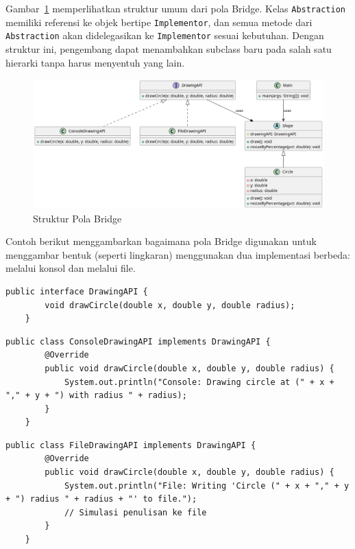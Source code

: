 Gambar~\ref{fig:bridge} memperlihatkan struktur umum dari pola Bridge. Kelas \texttt{Abstraction} memiliki referensi ke objek bertipe \texttt{Implementor}, dan semua metode dari \texttt{Abstraction} akan didelegasikan ke \texttt{Implementor} sesuai kebutuhan. Dengan struktur ini, pengembang dapat menambahkan subclass baru pada salah satu hierarki tanpa harus menyentuh yang lain.

\begin{figure}[h]
	\centering
	\includegraphics[width=\textwidth]{../figures/out/bridge.png}
	\caption{Struktur Pola Bridge}
	\label{fig:bridge}
\end{figure}

Contoh berikut menggambarkan bagaimana pola Bridge digunakan untuk menggambar bentuk (seperti lingkaran) menggunakan dua implementasi berbeda: melalui konsol dan melalui file.

\begin{lstlisting}[style=JavaStyle, caption={Implementor: DrawingAPI}, label={lst:bridge-api}]
	public interface DrawingAPI {
		void drawCircle(double x, double y, double radius);
	}
\end{lstlisting}

\begin{lstlisting}[style=JavaStyle, caption={Implementasi Konkret: ConsoleDrawingAPI}, label={lst:bridge-api-console}]
	public class ConsoleDrawingAPI implements DrawingAPI {
		@Override
		public void drawCircle(double x, double y, double radius) {
			System.out.println("Console: Drawing circle at (" + x + "," + y + ") with radius " + radius);
		}
	}
\end{lstlisting}

\begin{lstlisting}[style=JavaStyle, caption={Implementasi Konkret: FileDrawingAPI}, label={lst:bridge-api-file}]
	public class FileDrawingAPI implements DrawingAPI {
		@Override
		public void drawCircle(double x, double y, double radius) {
			System.out.println("File: Writing 'Circle (" + x + "," + y + ") radius " + radius + "' to file.");
			// Simulasi penulisan ke file
		}
	}
\end{lstlisting}

